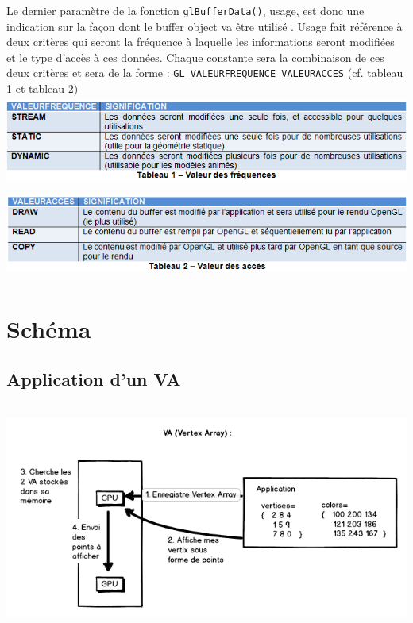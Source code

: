 Le dernier paramètre de la fonction \verb|glBufferData()|, usage, est donc une indication sur la façon dont le buffer object va être utilisé . Usage fait référence à deux critères qui seront la fréquence à laquelle les informations seront modifiées et le type d’accès à ces données. Chaque constante sera la combinaison de ces deux critères et sera de la forme : \verb|GL_VALEURFREQUENCE_VALEURACCES| (cf. tableau 1 et tableau 2)
\\
\includegraphics[width=15cm,height=2.94cm]{img/tableau1.png}
\\
\includegraphics[width=15cm,height=3cm]{img/tableau2.png}

\section{Schéma}
\subsection{Application d'un VA}
\includegraphics[width=15cm,height=7.48cm]{img/VA.png}
